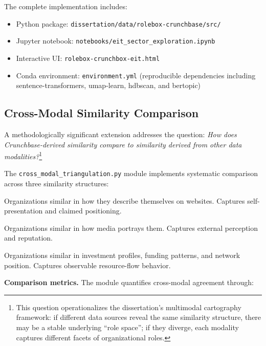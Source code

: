 \documentclass[../main.tex]{subfiles}
\begin{document}
\noindent The complete implementation includes:
\begin{itemize}
    \item Python package: \texttt{dissertation/data/rolebox-crunchbase/src/}
    \item Jupyter notebook: \texttt{notebooks/eit\_sector\_exploration.ipynb}
    \item Interactive UI: \texttt{rolebox-crunchbox-eit.html}
    \item Conda environment: \texttt{environment.yml} (reproducible dependencies including sentence-transformers, umap-learn, hdbscan, and bertopic)
\end{itemize}

\subsection{Cross-Modal Similarity Comparison}

A methodologically significant extension addresses the question: \emph{How does Crunchbase-derived similarity compare to similarity derived from other data modalities?}\footnote{This question operationalizes the dissertation's multimodal cartography framework: if different data sources reveal the same similarity structure, there may be a stable underlying ``role space''; if they diverge, each modality captures different facets of organizational roles.}

The \texttt{cross\_modal\_triangulation.py} module implements systematic comparison across three similarity structures:

\begin{description}[leftmargin=0.5cm, itemsep=0.3em]
\item[Declared similarity (websites)] Organizations similar in how they describe themselves on websites. Captures self-presentation and claimed positioning.

\item[Attributed similarity (news)] Organizations similar in how media portrays them. Captures external perception and reputation.

\item[Enacted similarity (Crunchbase)] Organizations similar in investment profiles, funding patterns, and network position. Captures observable resource-flow behavior.
\end{description}

\noindent\textbf{Comparison metrics.} The module quantifies cross-modal agreement through:
\end{document}

